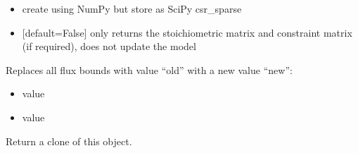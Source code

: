 \documentclass[letterpaper,10pt,english]{sphinxmanual}
\begin{document}
\begin{fulllineitems}
\begin{fulllineitems}
\begin{itemize}
\begin{itemize}
\item {} 
\sphinxAtStartPar
{} create using NumPy but store as SciPy csr\_sparse

\end{itemize}

\end{itemize}
\begin{itemize}
\item {} 
\sphinxAtStartPar
{} {[}default=False{]}  only returns the stoichiometric matrix and constraint matrix (if required),
does not update the model

\end{itemize}

\end{fulllineitems}


\begin{fulllineitems}
\label{\detokenize{modules_doc:cbmpy.CBModel.Model.changeAllFluxBoundsWithValue}}
\pysigstartsignatures
{}
\pysigstopsignatures
\sphinxAtStartPar
Replaces all flux bounds with value “old” with a new value “new”:
\begin{itemize}
\item {} 
\sphinxAtStartPar
{} value

\item {} 
\sphinxAtStartPar
{} value

\end{itemize}

\end{fulllineitems}


\begin{fulllineitems}
\label{\detokenize{modules_doc:cbmpy.CBModel.Model.clone}}
\pysigstartsignatures
{}
\pysigstopsignatures
\sphinxAtStartPar
Return a clone of this object.

\end{fulllineitems}



\end{fulllineitems}
\end{document}
